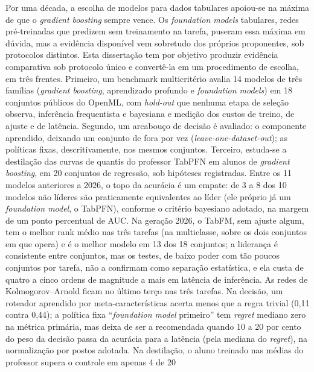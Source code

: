 Por uma década, a escolha de modelos para dados tabulares apoiou-se na
máxima de que o \emph{gradient boosting} sempre vence. Os
\emph{foundation models} tabulares, redes pré-treinadas que predizem sem
treinamento na tarefa, puseram essa máxima em dúvida, mas a evidência
disponível vem sobretudo dos próprios proponentes, sob protocolos
distintos. Esta dissertação tem por objetivo produzir evidência
comparativa sob protocolo único e convertê-la em um procedimento de
escolha, em três frentes. Primeiro, um benchmark multicritério avalia 14
modelos de três famílias (\emph{gradient boosting}, aprendizado profundo
e \emph{foundation models}) em 18 conjuntos públicos do OpenML, com
\emph{hold-out} que nenhuma etapa de seleção observa, inferência
frequentista e bayesiana e medição dos custos de treino, de ajuste e de
latência. Segundo, um arcabouço de decisão é avaliado: o componente aprendido,
deixando um
conjunto de fora por vez (\emph{leave-one-dataset-out}); as políticas
fixas, descritivamente, nos mesmos conjuntos. Terceiro,
estuda-se a destilação das curvas de quantis do professor TabPFN em
alunos de \emph{gradient boosting}, em 20 conjuntos de regressão, sob
hipóteses registradas. Entre os 11 modelos anteriores a 2026, o topo da
acurácia é um empate: de 3 a 8 dos 10 modelos não líderes são
praticamente equivalentes ao líder (ele próprio já um \emph{foundation
model}, o TabPFN), conforme o critério bayesiano
adotado, na margem de um ponto percentual de AUC. Na geração 2026, o
TabFM, sem ajuste algum, tem o melhor rank médio nas três tarefas (na
multiclasse, sobre os dois conjuntos em que opera) e é o
melhor modelo em 13 dos 18 conjuntos; a liderança é consistente entre
conjuntos, mas os testes, de baixo poder com tão poucos conjuntos por
tarefa, não a confirmam como separação estatística, e ela custa de
quatro a cinco ordens de magnitude a mais em latência de inferência. As
redes de Kolmogorov--Arnold ficam no último terço nas três tarefas. Na
decisão, um roteador aprendido por meta-características acerta menos que
a regra trivial (0,11 contra 0,44); a política fixa ``\emph{foundation
model} primeiro'' tem \emph{regret} mediano zero na métrica primária,
mas deixa de ser a recomendada quando 10 a 20 por cento do peso da
decisão passa da acurácia para a latência (pela mediana do
\emph{regret}), na normalização por postos
adotada. Na destilação, o aluno
treinado nas médias do professor supera o controle em apenas 4 de 20
